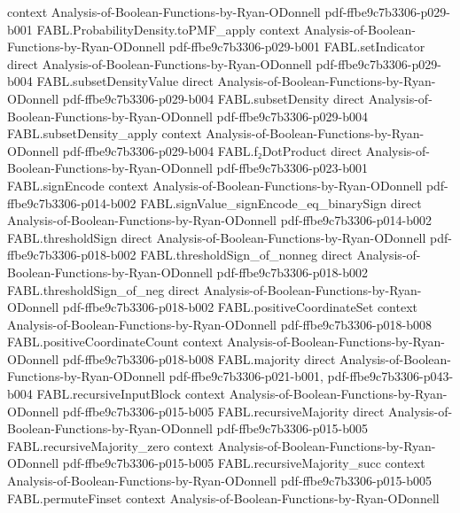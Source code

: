 \begin{theorem}
  {context}
  {Analysis-of-Boolean-Functions-by-Ryan-ODonnell}
  {pdf-ffbe9c7b3306-p029-b001}
\proofstep
  {FABL.ProbabilityDensity.toPMF_apply}
  {context}
  {Analysis-of-Boolean-Functions-by-Ryan-ODonnell}
  {pdf-ffbe9c7b3306-p029-b001}
\proofstep
  {FABL.setIndicator}
  {direct}
  {Analysis-of-Boolean-Functions-by-Ryan-ODonnell}
  {pdf-ffbe9c7b3306-p029-b004}
\proofstep
  {FABL.subsetDensityValue}
  {direct}
  {Analysis-of-Boolean-Functions-by-Ryan-ODonnell}
  {pdf-ffbe9c7b3306-p029-b004}
\proofstep
  {FABL.subsetDensity}
  {direct}
  {Analysis-of-Boolean-Functions-by-Ryan-ODonnell}
  {pdf-ffbe9c7b3306-p029-b004}
\proofstep
  {FABL.subsetDensity_apply}
  {context}
  {Analysis-of-Boolean-Functions-by-Ryan-ODonnell}
  {pdf-ffbe9c7b3306-p029-b004}
\proofstep
  {FABL.f₂DotProduct}
  {direct}
  {Analysis-of-Boolean-Functions-by-Ryan-ODonnell}
  {pdf-ffbe9c7b3306-p023-b001}
\proofstep
  {FABL.signEncode}
  {context}
  {Analysis-of-Boolean-Functions-by-Ryan-ODonnell}
  {pdf-ffbe9c7b3306-p014-b002}
\proofstep
  {FABL.signValue_signEncode_eq_binarySign}
  {direct}
  {Analysis-of-Boolean-Functions-by-Ryan-ODonnell}
  {pdf-ffbe9c7b3306-p014-b002}
\proofstep
  {FABL.thresholdSign}
  {direct}
  {Analysis-of-Boolean-Functions-by-Ryan-ODonnell}
  {pdf-ffbe9c7b3306-p018-b002}
\proofstep
  {FABL.thresholdSign_of_nonneg}
  {direct}
  {Analysis-of-Boolean-Functions-by-Ryan-ODonnell}
  {pdf-ffbe9c7b3306-p018-b002}
\proofstep
  {FABL.thresholdSign_of_neg}
  {direct}
  {Analysis-of-Boolean-Functions-by-Ryan-ODonnell}
  {pdf-ffbe9c7b3306-p018-b002}
\proofstep
  {FABL.positiveCoordinateSet}
  {context}
  {Analysis-of-Boolean-Functions-by-Ryan-ODonnell}
  {pdf-ffbe9c7b3306-p018-b008}
\proofstep
  {FABL.positiveCoordinateCount}
  {context}
  {Analysis-of-Boolean-Functions-by-Ryan-ODonnell}
  {pdf-ffbe9c7b3306-p018-b008}
\proofstep
  {FABL.majority}
  {direct}
  {Analysis-of-Boolean-Functions-by-Ryan-ODonnell}
  {pdf-ffbe9c7b3306-p021-b001,
    pdf-ffbe9c7b3306-p043-b004}
\proofstep
  {FABL.recursiveInputBlock}
  {context}
  {Analysis-of-Boolean-Functions-by-Ryan-ODonnell}
  {pdf-ffbe9c7b3306-p015-b005}
\proofstep
  {FABL.recursiveMajority}
  {direct}
  {Analysis-of-Boolean-Functions-by-Ryan-ODonnell}
  {pdf-ffbe9c7b3306-p015-b005}
\proofstep
  {FABL.recursiveMajority_zero}
  {context}
  {Analysis-of-Boolean-Functions-by-Ryan-ODonnell}
  {pdf-ffbe9c7b3306-p015-b005}
\proofstep
  {FABL.recursiveMajority_succ}
  {context}
  {Analysis-of-Boolean-Functions-by-Ryan-ODonnell}
  {pdf-ffbe9c7b3306-p015-b005}
\proofstep
  {FABL.permuteFinset}
  {context}
  {Analysis-of-Boolean-Functions-by-Ryan-ODonnell}

\end{theorem}
